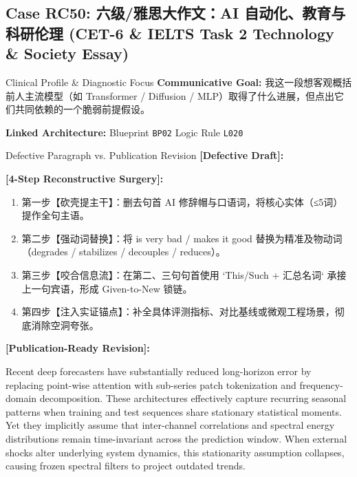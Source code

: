 \subsection{Case RC50: 六级/雅思大作文：AI 自动化、教育与科研伦理 (CET-6 \& IELTS Task 2 Technology \& Society Essay)}\label{case:RC50}
\begin{ConceptBox}{Clinical Profile \& Diagnostic Focus}
\textbf{Communicative Goal:} 我这一段想客观概括前人主流模型（如 Transformer / Diffusion / MLP）取得了什么进展，但点出它们共同依赖的一个脆弱前提假设。\par
\textbf{Linked Architecture:} Blueprint \texttt{BP02} \enspace\textbar\enspace Logic Rule \texttt{L020}
\end{ConceptBox}
\begin{ExampleBox}{Defective Paragraph vs. Publication Revision}
\textbf{\color{TargetHighlight}[Defective Draft]:}\par
{}\par\vspace{6pt}
\textbf{\color{AcadForest}[4-Step Reconstructive Surgery]:}
\begin{enumerate}[label=\textbf{\color{AcadNavy}Step \arabic*:}, leftmargin=2em]
  \item 第一步【砍壳提主干】：删去句首 AI 修辞帽与口语词，将核心实体（≤5词）提作全句主语。
  \item 第二步【强动词替换】：将 is very bad / makes it good 替换为精准及物动词（degrades / stabilizes / decouples / reduces）。
  \item 第三步【咬合信息流】：在第二、三句句首使用 `This/Such + 汇总名词` 承接上一句宾语，形成 Given-to-New 锁链。
  \item 第四步【注入实证锚点】：补全具体评测指标、对比基线或微观工程场景，彻底消除空洞夸张。
\end{enumerate}\vspace{4pt}
\textbf{\color{AcadNavy}[Publication-Ready Revision]:}\par
Recent deep forecasters have substantially reduced long-horizon error by replacing point-wise attention with sub-series patch tokenization and frequency-domain decomposition. These architectures effectively capture recurring seasonal patterns when training and test sequences share stationary statistical moments. Yet they implicitly assume that inter-channel correlations and spectral energy distributions remain time-invariant across the prediction window. When external shocks alter underlying system dynamics, this stationarity assumption collapses, causing frozen spectral filters to project outdated trends.
\end{ExampleBox}
